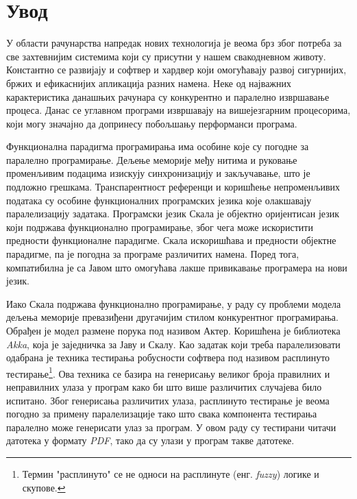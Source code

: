 \documentclass[12pt,oneside]{memoir}
\begin{document}
\frontmatter
\naslovna
\komisija
\apstrakt
\tableofcontents*

\mainmatter

\chapter{Увод}

У области рачунарства напредак нових технологија је веома брз због потреба за све захтевнијим системима који су присутни у нашем свакодневном животу. Константно се развијају и софтвер и хардвер који омогућавају развој сигурнијих, бржих и ефикаснијих апликација разних намена. Неке од најважних карактеристика данашњих рачунара су конкурентно и паралелно извршавање процеса. Данас се углавном програми извршавају на вишејезгарним процесорима, који могу значајно да допринесу побољшању перформанси програма. 

Функционална парадигма програмирања има особине које су погодне за паралелно програмирање. Дељење меморије међу нитима и руковање променљивим подацима изискују синхронизацију и закључавање, што је подложно грешкама. Транспарентност референци и коришћење непроменљивих података су особине функционалних програмских језика које олакшавају паралелизацију задатака. Програмски језик Скала је објектно оријентисан језик који подржава функционално програмирање, због чега може искористити предности функционалне парадигме. Скала искоришћава и предности објектне парадигме, па је погодна за програме различитих намена. Поред тога, компатибилна је са Јавом што омогућава лакше привикавање програмера на нови језик.

Иако Скала подржава функционално програмирање, у раду су проблеми модела дељења меморије превазиђени другачијим стилом конкурентног програмирања. Обрађен је модел размене порука под називом Актер. Коришћена је библиотека \textit{Akka}, која је заједничка за Јаву и Скалу. Као задатак који треба паралелизовати одабрана је техника тестирања робусности софтвера под називом расплинуто тестирање\footnote{Термин "расплинуто" се не односи на расплинуте (енг. \textit{fuzzy}) логике и скупове.}. Ова техника се базира на генерисању великог броја правилних и неправилних улаза у програм како би што више различитих случајева било испитано. Због генерисања различитих улаза, расплинуто тестирање је веома погодно за примену паралелизације тако што свака компонента тестирања паралелно може генерисати улаз за програм. У овом раду су тестирани читачи датотека у формату \textit{PDF}, тако да су улази у програм такве датотеке.
\end{document}
